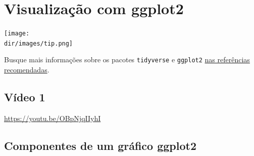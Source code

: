 \documentclass[
  11pt]{report}
\newcommand{\dir}{/ssd/R/x86_64-pc-linux-gnu-library/4.2/fnaufelRmd/rmarkdown/resources}
\newenvironment{rmdtip}
{
  \begin{mytip}
    \texttt{[image: \\dir/images/tip.png]}
    \tcblower
  }
  {
  \end{mytip}
}
\begin{document}
\begin{enumerate}

\end{enumerate}

\hypertarget{viz}{%
\chapter{Visualização com ggplot2}\label{viz}}

\begin{rmdtip}
Busque mais informações sobre os pacotes \texttt{tidyverse} e \texttt{ggplot2} \protect\hyperlink{refrec}{nas referências recomendadas}.

\end{rmdtip}

\hypertarget{vuxeddeo-1-2}{%
\section{Vídeo 1}\label{vuxeddeo-1-2}}

\begin{center} \url{https://youtu.be/OBpNjqIIyhI} \end{center}

\hypertarget{componentes-de-um-gruxe1fico-ggplot2}{%
\section{Componentes de um gráfico ggplot2}\label{componentes-de-um-gruxe1fico-ggplot2}}
\end{document}
